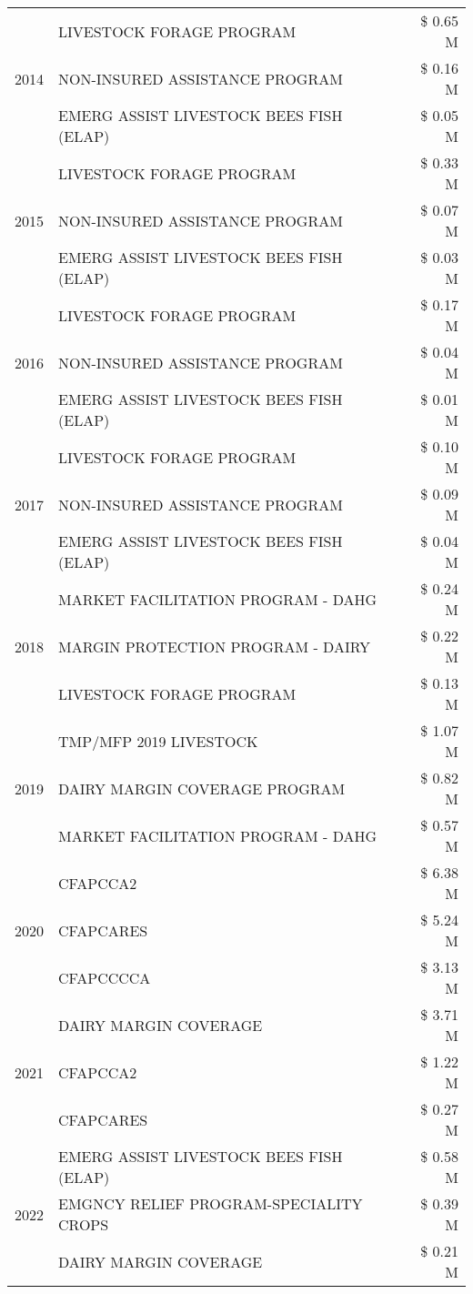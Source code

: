 \begin{tabular}{llr}
\cline{1-3}
\multirow[t]{3}{*}{2014} & LIVESTOCK FORAGE PROGRAM & \$ 0.65 M \\
 & NON-INSURED ASSISTANCE PROGRAM & \$ 0.16 M \\
 & EMERG ASSIST LIVESTOCK BEES FISH (ELAP) & \$ 0.05 M \\
\cline{1-3}
\multirow[t]{3}{*}{2015} & LIVESTOCK FORAGE PROGRAM & \$ 0.33 M \\
 & NON-INSURED ASSISTANCE PROGRAM & \$ 0.07 M \\
 & EMERG ASSIST LIVESTOCK BEES FISH (ELAP) & \$ 0.03 M \\
\cline{1-3}
\multirow[t]{3}{*}{2016} & LIVESTOCK FORAGE PROGRAM & \$ 0.17 M \\
 & NON-INSURED ASSISTANCE PROGRAM & \$ 0.04 M \\
 & EMERG ASSIST LIVESTOCK BEES FISH (ELAP) & \$ 0.01 M \\
\cline{1-3}
\multirow[t]{3}{*}{2017} & LIVESTOCK FORAGE PROGRAM & \$ 0.10 M \\
 & NON-INSURED ASSISTANCE PROGRAM & \$ 0.09 M \\
 & EMERG ASSIST LIVESTOCK BEES FISH (ELAP) & \$ 0.04 M \\
\cline{1-3}
\multirow[t]{3}{*}{2018} & MARKET FACILITATION PROGRAM - DAHG & \$ 0.24 M \\
 & MARGIN PROTECTION PROGRAM - DAIRY & \$ 0.22 M \\
 & LIVESTOCK FORAGE PROGRAM & \$ 0.13 M \\
\cline{1-3}
\multirow[t]{3}{*}{2019} & TMP/MFP 2019 LIVESTOCK & \$ 1.07 M \\
 & DAIRY MARGIN COVERAGE PROGRAM & \$ 0.82 M \\
 & MARKET FACILITATION PROGRAM - DAHG & \$ 0.57 M \\
\cline{1-3}
\multirow[t]{3}{*}{2020} & CFAPCCA2 & \$ 6.38 M \\
 & CFAPCARES & \$ 5.24 M \\
 & CFAPCCCCA & \$ 3.13 M \\
\cline{1-3}
\multirow[t]{3}{*}{2021} & DAIRY MARGIN COVERAGE & \$ 3.71 M \\
 & CFAPCCA2 & \$ 1.22 M \\
 & CFAPCARES & \$ 0.27 M \\
\cline{1-3}
\multirow[t]{3}{*}{2022} & EMERG ASSIST LIVESTOCK BEES FISH (ELAP) & \$ 0.58 M \\
 & EMGNCY RELIEF PROGRAM-SPECIALITY CROPS & \$ 0.39 M \\
 & DAIRY MARGIN COVERAGE & \$ 0.21 M \\
\cline{1-3}
\bottomrule
\end{tabular}
